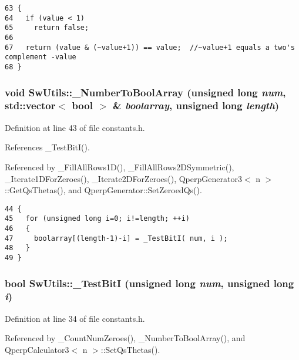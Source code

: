 \begin{Code}\begin{verbatim}63 {
64   if (value < 1)
65     return false;
66 
67   return (value & (~value+1)) == value;  //~value+1 equals a two's complement -value
68 }
\end{verbatim}
\end{Code}


\subsubsection{\setlength{\rightskip}{0pt plus 5cm}void SwUtils::\_\-NumberToBoolArray (unsigned long {\em num}, std::vector$<$ bool $>$ \& {\em boolarray}, unsigned long {\em length})\hspace{0.3cm}{\tt  [inline]}}\label{namespaceSwUtils_1b9e53b0f01225242c82fe97e878bd6d}




Definition at line 43 of file constants.h.

References \_\-TestBitI().

Referenced by \_\-FillAllRows1D(), \_\-FillAllRows2DSymmetric(), \_\-Iterate1DForZeroes(), \_\-Iterate2DForZeroes(), QperpGenerator3$<$ n $>$::GetQsThetas(), and QperpGenerator::SetZeroedQs().

\begin{Code}\begin{verbatim}44 {
45   for (unsigned long i=0; i!=length; ++i)
46   {
47     boolarray[(length-1)-i] = _TestBitI( num, i );
48   }
49 }
\end{verbatim}
\end{Code}


\subsubsection{\setlength{\rightskip}{0pt plus 5cm}bool SwUtils::\_\-TestBitI (unsigned long {\em num}, unsigned long {\em i})\hspace{0.3cm}{\tt  [inline]}}\label{namespaceSwUtils_58cbacdf24d6a8eddaae9fbbd58ecf78}




Definition at line 34 of file constants.h.

Referenced by \_\-CountNumZeroes(), \_\-NumberToBoolArray(), and QperpCalculator3$<$ n $>$::SetQsThetas().

